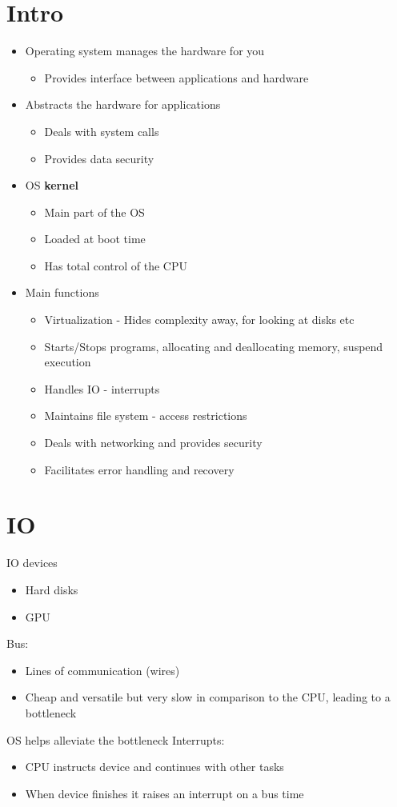 \documentclass{article}[18pt]
\begin{document}
\section{Intro}
\begin{itemize}
	\item Operating system manages the hardware for you
	\begin{itemize}
		\item Provides interface between applications and hardware
	\end{itemize}
	
	\item Abstracts the hardware for applications
	\begin{itemize}
		\item Deals with system calls
		\item Provides data security
	\end{itemize}
	
	\item OS \textbf{kernel}
	\begin{itemize}
		\item Main part of the OS
		\item Loaded at boot time
		\item Has total control of the CPU
	\end{itemize}
	
	\item Main functions
	\begin{itemize}
		\item Virtualization - Hides complexity away, for looking at disks etc
		\item Starts/Stops programs, allocating and deallocating memory, suspend execution
		\item Handles IO - interrupts 
		\item Maintains file system - access restrictions
		\item Deals with networking and provides security
		\item Facilitates error handling and recovery
	\end{itemize}
\end{itemize}
\section{IO}
IO devices
\begin{itemize}
	\item Hard disks
	\item GPU
\end{itemize}
Bus:
\begin{itemize}
	\item Lines of communication (wires)
	\item Cheap and versatile but very slow in comparison to the CPU, leading to a bottleneck
\end{itemize}
OS helps alleviate the bottleneck
Interrupts:
\begin{itemize}
	\item CPU instructs device and continues with other tasks
	\item When device finishes it raises an interrupt on a bus time
\end{itemize}
\end{document}
